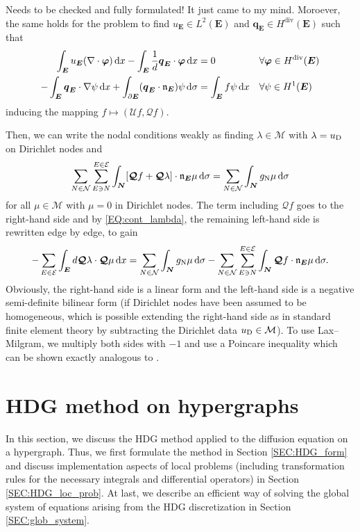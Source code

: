 \documentclass[a4paper, english, 12pt, reqno, draft]{amsart}
\theoremstyle{definition}
\theoremstyle{remark}
\numberwithin{equation}{section}
\newcommand{\setEdge}{\ensuremath{\mathcal E}}
\newcommand{\setNode}{\ensuremath{\mathcal N}}
\newcommand{\edge}{\ensuremath{E}}
\newcommand{\node}{\ensuremath{N}}
\newcommand{\Edge}{{\ensuremath{\boldsymbol E}}}
\newcommand{\Node}{{\ensuremath{\boldsymbol N}}}
\newcommand{\Normal}{\ensuremath{\mathfrak n_\Edge}}
\newcommand{\skeletalSpaceCont}{\ensuremath{\mathcal M}}
\renewcommand{\vec}[1]{\ensuremath{\boldsymbol{#1}}}
\newcommand{\dx}{\ensuremath{\, \textup d x}}
\newcommand{\ds}{\ensuremath{\, \textup d \sigma}}
\newcommand{\localU}{\ensuremath{\mathcal U}}
\newcommand{\localQ}{\ensuremath{\vec{\mathcal Q}}}
\begin{document}
\begin{envarerror}{Needs to be checked and fully formulated! It just came to my mind.}
Moroever, the same holds for the problem to find $u_\Edge \in L^2(\Edge)$ and $\vec q_\Edge \in H^{\operatorname{div}}(\Edge)$ such that
% 
\begin{subequations}
\begin{align}
 \int_\Edge u_\Edge (\nabla \cdot \vec \varphi) \dx - \int_\Edge \frac{1}{d} \vec q_\Edge \cdot \vec \varphi \dx & = 0 && \forall \vec \varphi \in H^{\operatorname{div}}(\Edge) \\
 - \int_\Edge \vec q_\Edge \cdot \nabla \psi \dx + \int_{\partial \Edge} (\vec q_\Edge \cdot \Normal) \psi \ds & = \int_\Edge f \psi \dx && \forall \psi \in H^1(\Edge)
\end{align}
\end{subequations}
% 
inducing the mapping $f \mapsto (\localU f, \localQ f)$.

Then, we can write the nodal conditions weakly as finding $\lambda \in \skeletalSpaceCont$ with $\lambda = u_\text D$ on Dirichlet nodes and
% 
\begin{equation}
 \sum_{\node \in \setNode} \sum_{\edge \ni \node}^{\edge \in \setEdge} \int_\Node [\localQ f + \localQ \lambda] \cdot \Normal \mu \ds = \sum_{\node \in \setNode} \int_\Node g_\text N \mu \ds
\end{equation}
% 
for all $\mu \in \skeletalSpaceCont$ with $\mu = 0$ in Dirichlet nodes. The term including $\localQ f$ goes to the right-hand side and by \eqref{EQ:cont_lambda}, the remaining left-hand side is rewritten edge by edge, to gain
% 
\begin{equation}
 - \sum_{\edge \in \setEdge} \int_\Edge d \localQ \lambda \cdot \localQ \mu \dx = \sum_{\node \in \setNode} \int_\Node g_\text N \mu \ds - \sum_{\node \in \setNode} \sum_{\edge \ni \node}^{\edge \in \setEdge} \int_\Node \localQ f \cdot \Normal \mu \ds.
\end{equation}
% 
Obviously, the right-hand side is a linear form and the left-hand side is a negative semi-definite bilinear form (if Dirichlet nodes have been assumed to be homogeneous, which is possible extending the right-hand side as in standard finite element theory by subtracting the Dirichlet data $u_\textup D \in \skeletalSpaceCont$). To use Lax--Milgram, we multiply both sides with $-1$ and use a Poincare inequality which can be shown exactly analogous to \cite[Satz 6.21]{Dobrowolski2010}.
% 
\end{envarerror}
% 
\section{HDG method on hypergraphs}\label{SEC:hdg_graph}
%
In this section, we discuss the HDG method applied to the diffusion equation on a hypergraph. Thus, we first formulate the method in Section \ref{SEC:HDG_form} and discuss implementation aspects of local problems (including transformation rules for the necessary integrals and differential operators) in Section \ref{SEC:HDG_loc_prob}. At last, we describe an efficient way of solving the global system of equations arising from the HDG discretization in Section \ref{SEC:glob_system}.
% 
\end{document}
